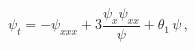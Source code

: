 \begin{equation*}
  \psi_t =- \psi_{xxx} +
3\frac{\psi_x\psi_{xx}}{\psi} + \theta_1\,\psi\,,
\end{equation*}

